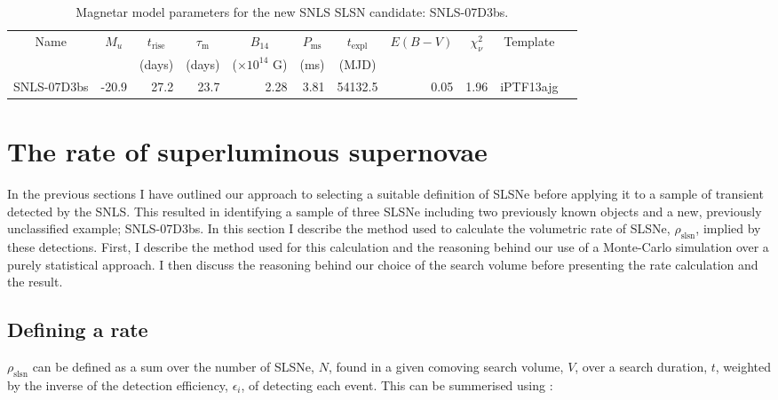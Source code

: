 \begin{table}
\begin{center}
\caption{Magnetar model parameters for the new SNLS SLSN candidate: SNLS-07D3bs.}
\label{tab:07d3bsParams}
\begin{tabular}{|l|r|r|r|r|r|r|r|r|r|r|}
\hline
  \multicolumn{1}{|c|}{Name} &
  \multicolumn{1}{c|}{$M_u$} &
  \multicolumn{1}{c|}{$t_\mathrm{rise}$} &
  \multicolumn{1}{c|}{$\tau_\mathrm{m}$} &
  \multicolumn{1}{c|}{$B_{14}$} &
  \multicolumn{1}{c|}{$P_{\mathrm{ms}}$} &
  \multicolumn{1}{c|}{$t_\mathrm{expl}$} &
  \multicolumn{1}{c|}{$E(B-V)$} &
  \multicolumn{1}{c|}{$\chi^2_{\nu}$} &
  \multicolumn{1}{c|}{Template} \\ & &
  \multicolumn{1}{c|}{(days)} &
  \multicolumn{1}{c|}{(days)} &
  \multicolumn{1}{c|}{($\times10^{14}$ G)} &
  \multicolumn{1}{c|}{(ms)} &
  \multicolumn{1}{c|}{(MJD)} & \\
\hline
SNLS-07D3bs & -20.9 &  27.2 & 23.7 & 2.28 & 3.81 & 54132.5 & 0.05 & 1.96 & iPTF13ajg\\
\hline
\end{tabular}
\end{center}
\end{table}

\section{The rate of superluminous supernovae}
\label{sec:MC}
In the previous sections I have outlined our approach to selecting a suitable definition of SLSNe before applying it to a sample of transient detected by the SNLS. This resulted in identifying a sample of three SLSNe including two previously known objects and a new, previously unclassified example; SNLS-07D3bs. In this section I describe the method used to calculate the volumetric rate of SLSNe, $\rho_{\mathrm{slsn}}$, implied by these detections. First, I describe the method used for this calculation and the reasoning behind our use of a Monte-Carlo simulation over a purely statistical approach. I then discuss the reasoning behind our choice of the search volume before presenting the rate calculation and the result.

\subsection{Defining a rate}
\label{sec:method}
$\rho_{\mathrm{slsn}}$ can be defined as a sum over the number of SLSNe, $N$, found in a given comoving search volume, $V$, over a search duration, $t$, weighted by the inverse of the detection efficiency, $\epsilon_{i}$, of detecting each event. This can be summerised using :

